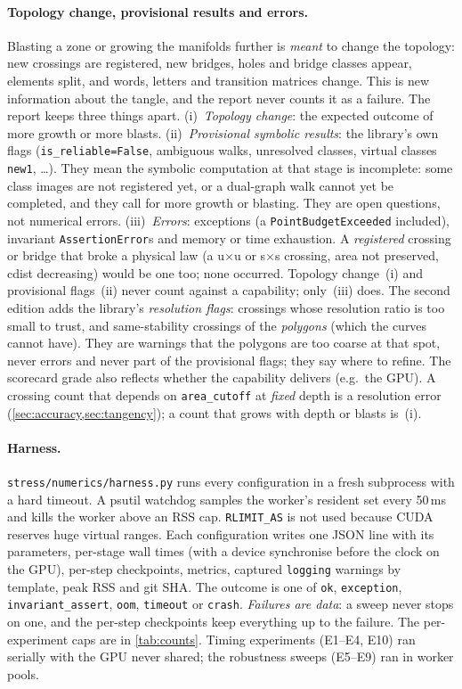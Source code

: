 \documentclass[11pt,a4paper]{article}
\newcommand{\code}[1]{\texttt{#1}}
\begin{document}
\paragraph{Topology change, provisional results and errors.} Blasting a zone
or growing the manifolds further is \emph{meant} to change the topology:
new crossings are registered, new bridges, holes and bridge classes appear,
elements split, and words, letters and transition matrices change. This is
new information about the tangle, and the report never counts it as a
failure. The report keeps three things apart.
(i)~\emph{Topology change}: the expected outcome of more growth or more
blasts. (ii)~\emph{Provisional symbolic results}: the library's own flags
(\code{is\_reliable=False}, ambiguous walks, unresolved classes, virtual
classes \code{new1}, \ldots). They mean the symbolic computation at that
stage is incomplete: some class images are not registered yet, or a
dual-graph walk cannot yet be completed, and they call for more growth or
blasting. They are open questions, not
numerical errors. (iii)~\emph{Errors}: exceptions (a
\code{PointBudgetExceeded} included), invariant \code{AssertionError}s and
memory or time exhaustion. A \emph{registered} crossing or bridge that broke
a physical law (a u$\times$u or s$\times$s crossing, area not preserved,
cdist decreasing) would be one too; none occurred. Topology change~(i) and
provisional flags~(ii) never count against a capability; only~(iii) does.
The second edition adds the library's \emph{resolution flags}: crossings
whose resolution ratio is too small to trust, and same-stability crossings
of the \emph{polygons} (which the curves cannot have). They are warnings that
the polygons are too coarse at that spot, never errors and never part of the
provisional flags; they say where to refine. The scorecard grade also
reflects whether the capability delivers (e.g.\ the GPU). A crossing count that
depends on \code{area\_cutoff} at \emph{fixed} depth is a resolution error
(\cref{sec:accuracy,sec:tangency}); a count that grows with depth or blasts
is~(i).

\paragraph{Harness.} \code{stress/numerics/harness.py} runs every
configuration in a fresh subprocess with a hard timeout. A psutil watchdog
samples the worker's resident set every 50\,ms and kills the worker above an
RSS cap. \code{RLIMIT\_AS} is not used because CUDA reserves huge virtual
ranges. Each configuration writes one JSON line with its parameters,
per-stage wall times (with a device synchronise before the clock on the
GPU), per-step checkpoints, metrics, captured \code{logging} warnings by
template, peak RSS and git SHA. The outcome is one of \code{ok},
\code{exception}, \code{invariant\_assert}, \code{oom}, \code{timeout} or
\code{crash}. \emph{Failures are data}: a sweep never stops on one, and the
per-step checkpoints keep everything up to the failure. The per-experiment
caps are in \cref{tab:counts}. Timing experiments (E1--E4, E10) ran serially
with the GPU never shared; the robustness sweeps (E5--E9) ran in worker
pools.
\end{document}
